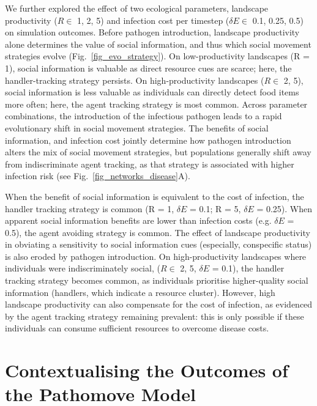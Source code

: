 We further explored the effect of two ecological parameters, landscape productivity ($R \in $ 1, 2, 5) and infection cost per timestep ($\delta E \in$ 0.1, 0.25, 0.5) on simulation outcomes.
Before pathogen introduction, landscape productivity alone determines the value of social information, and thus which social movement strategies evolve (Fig.~\ref{fig_evo_strategy}).
On low-productivity landscapes (R = 1), social information is valuable as direct resource cues are scarce; here, the handler-tracking strategy persists.
On high-productivity landscapes ($R \in$ 2, 5), social information is less valuable as individuals can directly detect food items more often; here, the agent tracking strategy is most common.
Across parameter combinations, the introduction of the infectious pathogen leads to a rapid evolutionary shift in social movement strategies.
The benefits of social information, and infection cost jointly determine how pathogen introduction alters the mix of social movement strategies, but populations generally shift away from indiscriminate agent tracking, as that strategy is associated with higher infection risk (see Fig.~\ref{fig_networks_disease}A).

When the benefit of social information is equivalent to the cost of infection, the handler tracking strategy is common (R = 1, $\delta E$ = 0.1; R = 5, $\delta E$ = 0.25).
When apparent social information benefits are lower than infection costs (e.g. $\delta E$ = 0.5), the agent avoiding strategy is common.
The effect of landscape productivity in obviating a sensitivity to social information cues (especially, conspecific status) is also eroded by pathogen introduction.
On high-productivity landscapes where individuals were indiscriminately social, ($R \in$ 2, 5, $\delta E$ = 0.1), the handler tracking strategy becomes common, as individuals prioritise higher-quality social information (handlers, which indicate a resource cluster).
However, high landscape productivity can also compensate for the cost of infection, as evidenced by the agent tracking strategy remaining prevalent: this is only possible if these individuals can consume sufficient resources to overcome disease costs.

\section*{Contextualising the Outcomes of the Pathomove Model}

